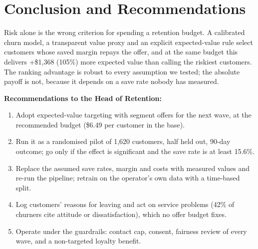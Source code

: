 \documentclass[11pt,a4paper]{article}
\begin{document}
\section{Conclusion and Recommendations}

Risk alone is the wrong criterion for spending a retention budget. A calibrated churn model, a transparent value proxy and an explicit expected-value rule select customers whose saved margin repays the offer, and at the same budget this delivers +\$1,368 (105\%) more expected value than calling the riskiest customers. The ranking advantage is robust to every assumption we tested; the absolute payoff is not, because it depends on a save rate nobody has measured.

\textbf{Recommendations to the Head of Retention:}
\begin{enumerate}
  \item Adopt expected-value targeting with segment offers for the next wave, at the recommended budget (\$6.49 per customer in the base).
  \item Run it as a randomised pilot of 1,620 customers, half held out, 90-day outcome; go only if the effect is significant and the save rate is at least 15.6\%.
  \item Replace the assumed save rates, margin and costs with measured values and re-run the pipeline; retrain on the operator's own data with a time-based split.
  \item Log customers' reasons for leaving and act on service problems (42\% of churners cite attitude or dissatisfaction), which no offer budget fixes.
  \item Operate under the guardrails: contact cap, consent, fairness review of every wave, and a non-targeted loyalty benefit.
\end{enumerate}
\end{document}
